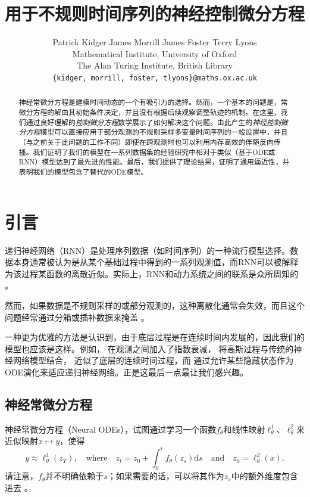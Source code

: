 \documentclass{ctexart}
\title{用于不规则时间序列的神经控制微分方程}
\author{Patrick Kidger \qquad James Morrill \qquad James Foster \qquad Terry Lyons\\[2pt]
	Mathematical Institute, University of Oxford \\
	The Alan Turing Institute, British Library \\
	\texttt{\{kidger, morrill, foster, tlyons\}@\hspace{0.8pt}maths.ox.ac.uk}}
\theoremstyle{plain}
\theoremstyle{definition}
\begin{document}
	\maketitle
\begin{abstract}
		神经常微分方程是建模时间动态的一个有吸引力的选择。然而，一个基本的问题是，常微分方程的解由其初始条件决定，并且没有根据后续观察调整轨迹的机制。在这里，我们通过良好理解的\emph{控制微分方程}数学展示了如何解决这个问题。由此产生的\emph{神经控制微分方程}模型可以直接应用于部分观测的不规则采样多变量时间序列的一般设置中，并且（与之前关于此问题的工作不同）即使在跨观测时也可以利用内存高效的伴随反向传播。我们证明了我们的模型在一系列数据集的经验研究中相对于类似（基于ODE或RNN）模型达到了最先进的性能。最后，我们提供了理论结果，证明了通用逼近性，并表明我们的模型包含了替代的ODE模型。
\end{abstract}
	\section{引言}
	递归神经网络（RNN）是处理序列数据（如时间序列）的一种流行模型选择。数据本身通常被认为是从某个基础过程中得到的一系列观测值，而RNN可以被解释为该过程某函数的离散近似。实际上，RNN和动力系统之间的联系是众所周知的 \cite{FUNAHASHI1993801, rnn-dynamical, E2017, nais-net}。
	
	然而，如果数据是不规则采样的或部分观测的，这种离散化通常会失效，而且这个问题经常通过分箱或插补数据来掩盖 \cite{gelman2007dataanalysis}。
	
	一种更为优雅的方法是认识到，由于底层过程是在连续时间内发展的，因此我们的模型也应该是这样。例如，\cite{Che2018, BRITS, NeuralHawkes, discreteevent} 在观测之间加入了指数衰减，\cite{gp-adapter1, gp-adapter2} 将高斯过程与传统的神经网络模型结合，\cite{interpolation-prediction} 近似了底层的连续时间过程，而 \cite{latent-odes, gru-ode-bayes} 通过允许某些隐藏状态作为ODE演化来适应递归神经网络。正是这最后一点最让我们感兴趣。
	
	\subsection{神经常微分方程}
	神经常微分方程（Neural ODEs）\cite{E2017, neural-odes}，试图通过学习一个函数$f_\theta$和线性映射$\ell^1_\theta$、$\ell^2_\theta$来近似映射$x \mapsto y$，使得
\begin{equation}\label{eq:node}
	y \approx \ell^1_\theta(z_T),\quad\text{where}\quad z_t = z_0 + \int_0^t f_\theta(z_s) \mathrm{d} s\quad\text{and}\quad z_0 = \ell^2_\theta(x).
\end{equation}
	请注意，$f_\theta$并不明确依赖于$s$；如果需要的话，可以将其作为$z_s$中的额外维度包含进去 \cite[Appendix B.2]{neural-odes}。
	
\end{document}
